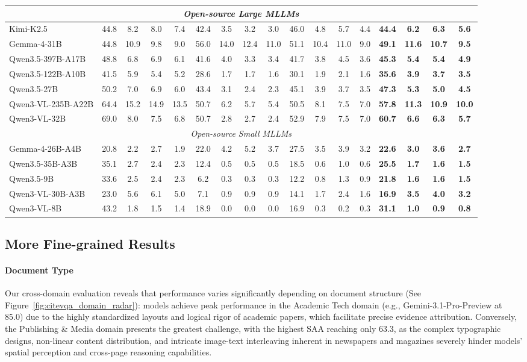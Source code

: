 \documentclass[]{opendatalab}
\begin{document}
{{{\begin{table}[htbp]
\begin{tabular}{@{}l cccc cccc cccc >{\bfseries}c>{\bfseries}c>{\bfseries}c>{\bfseries}c@{}}
\multicolumn{17}{c}{\textit{Open-source Large MLLMs}} \\ \midrule
Kimi-K2.5 &44.8&8.2&8.0&7.4&42.4&3.5&3.2&3.0&46.0&4.8&5.7&4.4&44.4&6.2&6.3&5.6 \\
Gemma-4-31B &44.8&10.9&9.8&9.0&56.0&14.0&12.4&11.0&51.1&10.4&11.0&9.0&49.1&11.6&10.7&9.5\\
Qwen3.5-397B-A17B&48.8&6.8&6.9&6.1&41.6&4.0&3.3&3.4&41.7&3.8&4.5&3.6&45.3&5.4&5.4&4.9\\
Qwen3.5-122B-A10B&41.5&5.9&5.4&5.2&28.6&1.7&1.7&1.6&30.1&1.9&2.1&1.6&35.6&3.9&3.7&3.5 \\
Qwen3.5-27B &50.2&7.0&6.9&6.0&43.4&3.1&2.4&2.3&45.1&3.9&3.7&3.5&47.3&5.3&5.0&4.5 \\
Qwen3-VL-235B-A22B &64.4&15.2&14.9&13.5&50.7&6.2&5.7&5.4&50.5&8.1&7.5&7.0&57.8&11.3&10.9&10.0\\
Qwen3-VL-32B&69.0&8.0&7.5&6.8&50.7&2.8&2.7&2.4&52.9&7.9&7.5&7.0&60.7&6.6&6.3&5.7\\
\midrule

\multicolumn{17}{c}{\textit{Open-source Small MLLMs}} \\ \midrule
Gemma-4-26B-A4B &20.8&2.2&2.7&1.9&22.0&4.2&5.2&3.7&27.5&3.5&3.9&3.2&22.6&3.0&3.6&2.7 \\
Qwen3.5-35B-A3B &35.1&2.7&2.4&2.3&12.4&0.5&0.5&0.5&18.5&0.6&1.0&0.6&25.5&1.7&1.6&1.5 \\
Qwen3.5-9B &33.6&2.5&2.4&2.3&6.2&0.3&0.3&0.3&12.2&0.8&1.3&0.9&21.8&1.6&1.6&1.5 \\
Qwen3-VL-30B-A3B &23.0&5.6&6.1&5.0&7.1&0.9&0.9&0.9&14.1&1.7&2.4&1.6&16.9&3.5&4.0&3.2\\
Qwen3-VL-8B &43.2&1.8&1.5&1.4&18.9&0.0&0.0&0.0&16.9&0.3&0.2&0.3&31.1&1.0&0.9&0.8 \\
\bottomrule
\end{tabular}
\end{table}

\subsection{More Fine-grained Results}
\label{Appendix: Fine-grained Results}
\paragraph{Document Type} Our cross-domain evaluation reveals that performance varies significantly depending on document structure (See Figure~\ref{fig:citevqa_domain_radar}): models achieve peak performance in the Academic Tech domain (e.g., Gemini-3.1-Pro-Preview at 85.0) due to the highly standardized layouts and logical rigor of academic papers, which facilitate precise evidence attribution. Conversely, the Publishing \& Media domain presents the greatest challenge, with the highest SAA reaching only 63.3, as the complex typographic designs, non-linear content distribution, and intricate image-text interleaving inherent in newspapers and magazines severely hinder models' spatial perception and cross-page reasoning capabilities.

}}}
\end{document}
